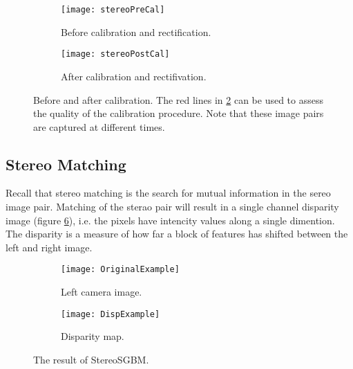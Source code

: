 \begin{figure}
	\centering
	\begin{subfigure}[b]{0.95\textwidth}
		\texttt{[image: stereoPreCal]}
		\caption{Before calibration and rectification.}
		\label{fig:stereoPreCal}
	\end{subfigure}
	\begin{subfigure}[b]{0.95\textwidth}
		\texttt{[image: stereoPostCal]}
		\caption{After calibration and rectifivation.}
		\label{fig:stereoPostCal}
	\end{subfigure}
	\caption{\label{fig:calibBeforeAfter}Before and after calibration. The red lines in \ref{fig:stereoPostCal} can be used to assess the quality of the calibration procedure. Note that these image pairs are captured at different times.}
\end{figure}


\subsection{Stereo Matching}

Recall that stereo matching is the search for mutual information in the sereo image pair. Matching of the sterao pair will result in a single channel disparity image (figure \ref{fig:StereoMatching}), i.e. the pixels have intencity values along a single dimention. The disparity is a measure of how far a block of features has shifted between the left and right image. 

\begin{figure}
	\centering
	\begin{subfigure}[b]{0.45\textwidth}
		\texttt{[image: OriginalExample]}
		\caption{Left camera image.}
		\label{fig:OriginalExample}
	\end{subfigure}
	\begin{subfigure}[b]{0.45\textwidth}
		\texttt{[image: DispExample]}
		\caption{Disparity map.}
		\label{fig:DispExample}
	\end{subfigure}
	\caption{\label{fig:StereoMatching}The result of StereoSGBM.}
\end{figure}

